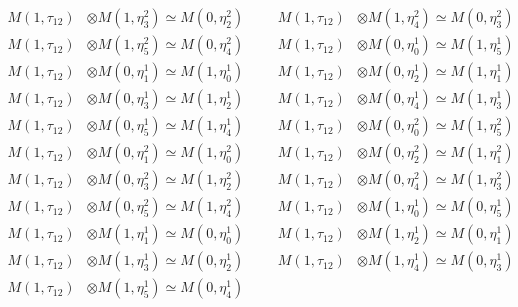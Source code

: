 \begin{align*}
M(1,\tau_{12}) &\otimes M(1,\eta^{2}_{3}) \simeq M(0,\eta^{2}_{2}) &&& M(1,\tau_{12}) &\otimes M(1,\eta^{2}_{4}) \simeq M(0,\eta^{2}_{3})\\
M(1,\tau_{12}) &\otimes M(1,\eta^{2}_{5}) \simeq M(0,\eta^{2}_{4}) &&& M(1,\tau_{12}) &\otimes M(0,\eta^{1}_{0}) \simeq M(1,\eta^{1}_{5})\\
M(1,\tau_{12}) &\otimes M(0,\eta^{1}_{1}) \simeq M(1,\eta^{1}_{0}) &&& M(1,\tau_{12}) &\otimes M(0,\eta^{1}_{2}) \simeq M(1,\eta^{1}_{1})\\
M(1,\tau_{12}) &\otimes M(0,\eta^{1}_{3}) \simeq M(1,\eta^{1}_{2}) &&& M(1,\tau_{12}) &\otimes M(0,\eta^{1}_{4}) \simeq M(1,\eta^{1}_{3})\\
M(1,\tau_{12}) &\otimes M(0,\eta^{1}_{5}) \simeq M(1,\eta^{1}_{4}) &&& M(1,\tau_{12}) &\otimes M(0,\eta^{2}_{0}) \simeq M(1,\eta^{2}_{5})\\
M(1,\tau_{12}) &\otimes M(0,\eta^{2}_{1}) \simeq M(1,\eta^{2}_{0}) &&& M(1,\tau_{12}) &\otimes M(0,\eta^{2}_{2}) \simeq M(1,\eta^{2}_{1})\\
M(1,\tau_{12}) &\otimes M(0,\eta^{2}_{3}) \simeq M(1,\eta^{2}_{2}) &&& M(1,\tau_{12}) &\otimes M(0,\eta^{2}_{4}) \simeq M(1,\eta^{2}_{3})\\
M(1,\tau_{12}) &\otimes M(0,\eta^{2}_{5}) \simeq M(1,\eta^{2}_{4}) &&& M(1,\tau_{12}) &\otimes M(1,\eta^{1}_{0}) \simeq M(0,\eta^{1}_{5})\\
M(1,\tau_{12}) &\otimes M(1,\eta^{1}_{1}) \simeq M(0,\eta^{1}_{0}) &&& M(1,\tau_{12}) &\otimes M(1,\eta^{1}_{2}) \simeq M(0,\eta^{1}_{1})\\
M(1,\tau_{12}) &\otimes M(1,\eta^{1}_{3}) \simeq M(0,\eta^{1}_{2}) &&& M(1,\tau_{12}) &\otimes M(1,\eta^{1}_{4}) \simeq M(0,\eta^{1}_{3})\\
M(1,\tau_{12}) &\otimes M(1,\eta^{1}_{5}) \simeq M(0,\eta^{1}_{4})
\end{align*}

